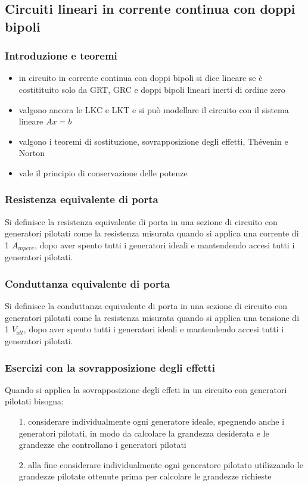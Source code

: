 \documentclass[a4paper]{article}
\begin{document}
\subsection{Circuiti lineari in corrente continua con doppi bipoli}
\subsubsection*{Introduzione e teoremi}
\begin{itemize}
	\item in circuito in corrente continua con doppi bipoli si dice lineare se è costitituito solo da GRT, GRC e doppi bipoli lineari
	inerti di ordine zero
	\item valgono ancora le LKC e LKT e si può modellare il circuito con il sistema lineare \(Ax = b\)
	\item valgono i teoremi di sostituzione, sovrapposizione degli effetti, Thévenin e Norton
	\item vale il principio di conservazione delle potenze
\end{itemize}

\subsubsection*{Resistenza equivalente di porta}
Si definisce la resistenza equivalente di porta in una sezione di circuito con generatori pilotati come la resistenza misurata quando
si applica una corrente di 1 \(A_{mpere}\), dopo aver spento tutti i generatori ideali e mantendendo accesi tutti i generatori pilotati.

\subsubsection*{Conduttanza equivalente di porta}
Si definisce la conduttanza equivalente di porta in una sezione di circuito con generatori pilotati come la resistenza misurata quando
si applica una tensione di 1 \(V_{olt}\), dopo aver spento tutti i generatori ideali e mantendendo accesi tutti i generatori pilotati.

\subsubsection*{Esercizi con la sovrapposizione degli effetti}
Quando si applica la sovrapposizione degli effeti in un circuito con generatori pilotati bisogna:
\begin{itemize}
	\item[1.] considerare individualmente ogni generatore ideale, spegnendo anche i generatori pilotati, in modo da calcolare la
	grandezza desiderata e le grandezze che controllano i generatori pilotati
	\item[2.] alla fine considerare individualmente ogni generatore pilotato utilizzando le grandezze pilotate ottenute prima per
	calcolare le grandezze richieste
\end{itemize}
\end{document}
